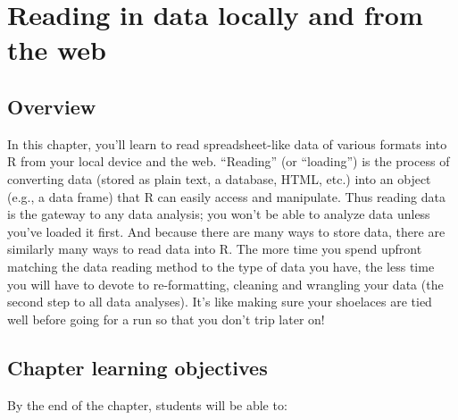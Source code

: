 \documentclass[
]{krantz}
\begin{document}
\hypertarget{reading}{%
\chapter{Reading in data locally and from the web}\label{reading}}

\hypertarget{overview}{%
\section{Overview}\label{overview}}

In this chapter, you'll learn to read spreadsheet-like data of various formats into R from your local device and the web. ``Reading'' (or ``loading'') is the process of converting data (stored as plain text, a database, HTML, etc.) into an object (e.g., a data frame) that R can easily access and manipulate. Thus reading data is the gateway to any data analysis; you won't be able to analyze data unless you've loaded it first. And because there are many ways to store data, there are similarly many ways to read data into R. The more time you spend upfront matching the data reading method to the type of data you have, the less time you will have to devote to re-formatting, cleaning and wrangling your data (the second step to all data analyses). It's like making sure your shoelaces are tied well before going for a run so that you don't trip later on!

\hypertarget{chapter-learning-objectives-1}{%
\section{Chapter learning objectives}\label{chapter-learning-objectives-1}}

By the end of the chapter, students will be able to:
\end{document}
